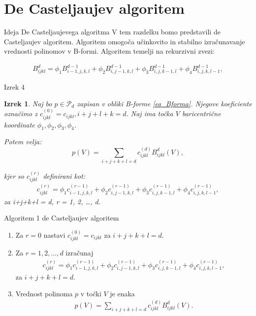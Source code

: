 \documentclass{beamer}
\newtheorem{theorem1}{Izrek}
\begin{document}
\section{De Casteljaujev algoritem}
\begin{frame}{Ideja De Casteljaujevega algoritma}
V tem razdelku bomo predstavili de Casteljaujev algoritem. Algoritem omogoča učinkovito in stabilno izračunavanje vrednosti polinomov v B-formi. Algoritem temelji na rekurzivni zvezi:

\begin{align*}
 B_{ijkl}^d = \phi_1 B_{i-1,j,k,l}^{d-1} + \phi_2 B_{i,j-1,k,l}^{d-1} + \phi_3 B_{i,j,k-1,l}^{d-1} + \phi_4 B_{i,j,k,l-1}^{d-1}, 
\end{align*}
\end{frame}


\begin{frame}{Izrek 4}
\begin{theorem1}
    Naj bo $p \in \mathcal{P}_d$ zapisan v obliki B-forme \eqref{eq_Bforma}. Njegove koeficiente označimo z $c_{ijkl}^{(0)} = c_{ijkl}, i+j+l+k = d$.
    Naj ima točka $V$ baricentrične koordinate $\phi_1, \phi_2, \phi_3, \phi_4$.

    Potem velja:
    $$
    p(V) = \sum_{i+j+k+l = d} c_{ijkl}^{(d)} B_{ijkl}^d(V),
    $$

    kjer so  $c_{ijkl}^{(r)}$ definirani kot:
    \begin{align*}
        c_{ijkl}^{(r)} = \phi_1 c_{i-1,j,k,l}^{(r-1)} + \phi_2 c_{i,j-1,k,l}^{(r-1)} + \phi_3 c_{i,j,k-1,l}^{(r-1)} + \phi_4 c_{i,j,k,l-1}^{(r-1)},
    \end{align*}
    za i+j+k+l = d, r = 1, 2, \ldots, d.
\end{theorem1}
\end{frame}


\begin{frame}{Algoritem 1}
de Casteljaujev algoritem
    \begin{enumerate}
        \item Za $r = 0$ nastavi $c_{ijkl}^{(0)} = c_{ijkl}$ za $i+j+k+l = d$.
        \item Za $r = 1, 2, \ldots, d$ izračunaj
        \begin{align*}
            c_{ijkl}^{(r)} = \phi_1 c_{i-1,j,k,l}^{(r-1)} + \phi_2 c_{i,j-1,k,l}^{(r-1)} + \phi_3 c_{i,j,k-1,l}^{(r-1)} + \phi_4 c_{i,j,k,l-1}^{(r-1)},
        \end{align*}
        za $i+j+k+l = d$.
        \item Vrednost polinoma $p$ v točki $V$ je enaka
        \begin{align*}
            p(V) = \sum_{i+j+k+l = d} c_{ijkl}^{(d)} B_{ijkl}^d(V).
        \end{align*}
    \end{enumerate}

\end{frame}
\end{document}
